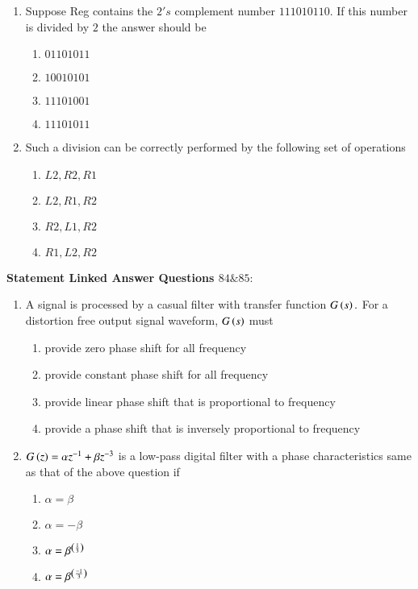 \documentclass[journal,15pt,onecolumn]{IEEEtran}
\theoremstyle{remark}
\begin{document}
\begin{enumerate}[start=82]
    \item Suppose Reg contains the $2\prime s$ complement number $111010110.$ If this number is divided by $2$ the answer should be
    \begin{enumerate}
        \item $01101011$
        \item $10010101$
        \item $11101001$
        \item $11101011$
    \end{enumerate}
    \item Such a division can be correctly performed by the following set of operations
    \begin{enumerate}
        \item $L2,R2,R1$
        \item $L2,R1,R2$
        \item $R2,L1,R2$
        \item $R1,L2,R2$
    \end{enumerate}
\end{enumerate}
\textbf{Statement Linked Answer Questions $84 \& 85:$}\\
\begin{enumerate}[start=84]
    \item A signal is processed by a casual filter with transfer function $G\left(s\right).$ For a distortion free output signal waveform, $G\left(s\right)$ must
    \begin{enumerate}
        \item provide zero phase shift for all frequency
        \item provide constant phase shift for all frequency
        \item provide linear phase shift that is proportional to frequency
        \item provide a phase shift that is inversely proportional to frequency
    \end{enumerate}
    \item $G\left(z\right)=\alpha z^{-1}+\beta z^{-3}$ is a low-pass digital filter with a phase characteristics same as that of the above question if
    \begin{enumerate}
        \item $\alpha =\beta$
        \item $\alpha =-\beta$
        \item $\alpha =\beta^{\left(\frac{1}{3}\right)}$
        \item $\alpha =\beta^{\left(\frac{-1}{3}\right)}$
    \end{enumerate}
\end{enumerate}
\end{document}
